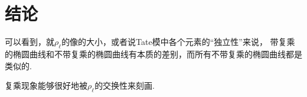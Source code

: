 \chapter{结论}

可以看到，就$\rho_{\ell}$的像的大小，或者说Tate模中各个元素的“独立性”来说，
带复乘的椭圆曲线和不带复乘的椭圆曲线有本质的差别，而所有不带复乘的椭圆曲线都是类似的.

复乘现象能够很好地被$\rho_{\ell}$的交换性来刻画.
